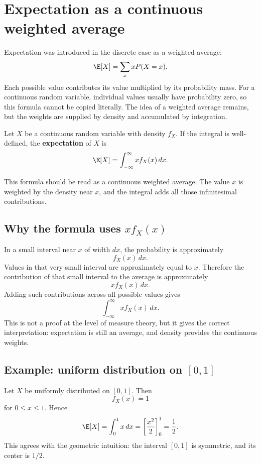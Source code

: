 \section{Expectation as a continuous weighted average}

Expectation was introduced in the discrete case as a weighted average:
\[
\E[X]=\sum_x xP(X=x).
\]
Each possible value contributes its value multiplied by its probability mass. For
a continuous random variable, individual values usually have probability zero, so
this formula cannot be copied literally. The idea of a weighted average remains,
but the weights are supplied by density and accumulated by integration.

\begin{definitionbox}
Let \(X\) be a continuous random variable with density \(f_X\). If the integral is
well-defined, the \textbf{expectation} of \(X\) is
\[
\E[X]=\int_{-\infty}^{\infty}x f_X(x)\,dx.
\]
\end{definitionbox}

This formula should be read as a continuous weighted average. The value \(x\) is
weighted by the density near \(x\), and the integral adds all those infinitesimal
contributions.

\subsection*{Why the formula uses \(x f_X(x)\)}

In a small interval near \(x\) of width \(dx\), the probability is approximately
\[
f_X(x)\,dx.
\]
Values in that very small interval are approximately equal to \(x\). Therefore
the contribution of that small interval to the average is approximately
\[
x f_X(x)\,dx.
\]
Adding such contributions across all possible values gives
\[
\int_{-\infty}^{\infty}x f_X(x)\,dx.
\]
This is not a proof at the level of measure theory, but it gives the correct
interpretation: expectation is still an average, and density provides the
continuous weights.

\subsection*{Example: uniform distribution on \([0,1]\)}

Let \(X\) be uniformly distributed on \([0,1]\). Then
\[
f_X(x)=1
\]
for \(0\leq x\leq1\). Hence
\[
\E[X]=\int_0^1 x\,dx=\left[\frac{x^2}{2}\right]_0^1=\frac12.
\]
This agrees with the geometric intuition: the interval \([0,1]\) is symmetric,
and its center is \(1/2\).

